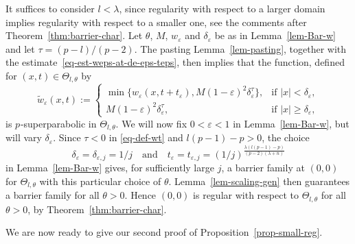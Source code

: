 \documentclass[a4paper, twoside]{article}
\makeatletter
\theoremstyle{propositional}
\theoremstyle{descriptive}
\renewenvironment{proof}[1][\proofname]{\par
  \pushQED{\qed}%
  \normalfont
  \trivlist
  \item[\hskip\labelsep
        \itshape
    #1\@addpunct{.}]\ignorespaces
}{%
  \popQED\endtrivlist\@endpefalse
}
\numberwithin{equation}{section}
\newcommand{\eps}{\varepsilon}
\newcommand{\de}{\delta}
\newcommand{\p}{{$p\mspace{1mu}$}}
\newcommand{\la}{\lambda}
\newcommand{\wt}{\widetilde{w}}
\makeatother
\begin{document}
\begin{proof}
It suffices to consider $l<\la$,
since regularity with respect to a larger domain implies regularity 
with respect to a smaller one,
see the comments after Theorem~\ref{thm:barrier-char}.
Let $\theta$, $M$, $w_\eps$ and $\de_\eps$ be as in Lemma~\ref{lem-Bar-w}
and let $\tau=(p-l)/(p-2)$.
The  pasting Lemma~\ref{lem-pasting}, together with the 
estimate~\eqref{eq-est-weps-at-de-eps-teps}, then implies  that the function,
defined for $(x,t)\in\Theta_{l,\theta}$ by
\begin{equation}   \label{eq-def-wt}
    \wt_\eps(x,t):=\begin{cases}
   \min\{w_{\eps}(x,t+t_\eps),M(1-\eps)^2\de_\eps^\tau\}, & \text{if }  
    |x| <  \de_\eps, \\
   M(1- \eps)^2\de_\eps^\tau, & \text{if }  
   |x| \ge  \de_\eps,
    \end{cases}
\end{equation}
is \p-superparabolic in $\Theta_{l,\theta}$.
We will now fix $0<\eps<1$ in Lemma~\ref{lem-Bar-w},
but will vary $\de_\eps$.
Since $\tau<0$ in \eqref{eq-def-wt} and $l(p-1)-p>0$, the choice
\[
\de_\eps= \de_{\eps,j}
= 1/j \quad \text{and}  \quad 
t_\eps= t_{\eps,j} 
= (1/j)^{\frac{\la (l(p-1)-p)}{(p-2)(\la+n)}}
\]
in Lemma~\ref{lem-Bar-w} 
gives, for sufficiently large $j$, a barrier family at $(0,0)$
for $\Theta_{l,\theta}$ with this particular choice of $\theta$.
Lemma~\ref{lem-scaling-gen} then guarantees a barrier family 
for all $\theta>0$.
Hence $(0,0)$ is regular with respect to $\Theta_{l,\theta}$ for all $\theta >0$,
by Theorem~\ref{thm:barrier-char}.
\end{proof}

We are now ready to give our second proof of 
Proposition~\ref{prop-small-reg}.
\end{document}
